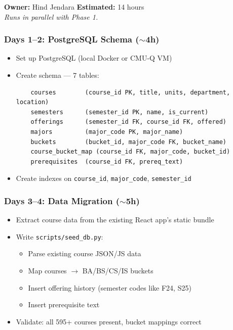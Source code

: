 \documentclass[11pt]{article}
\begin{document}
\textbf{Owner:} Hind Jendara \hfill \textbf{Estimated:} 14 hours\\
\textit{Runs in parallel with Phase 1.}

\subsubsection{Days 1--2: PostgreSQL Schema ($\sim$4h)}

\begin{itemize}[leftmargin=2em]
    \item Set up PostgreSQL (local Docker or CMU-Q VM)
    \item Create schema — 7 tables:
    
    \begin{verbatim}
    courses        (course_id PK, title, units, department, location)
    semesters      (semester_id PK, name, is_current)
    offerings      (semester_id FK, course_id FK, offered)
    majors         (major_code PK, major_name)
    buckets        (bucket_id, major_code FK, bucket_name)
    course_bucket_map (course_id FK, major_code, bucket_id)
    prerequisites  (course_id FK, prereq_text)
    \end{verbatim}
    
    \item Create indexes on \texttt{course\_id}, \texttt{major\_code}, \texttt{semester\_id}
\end{itemize}

\subsubsection{Days 3--4: Data Migration ($\sim$5h)}

\begin{itemize}[leftmargin=2em]
    \item Extract course data from the existing React app's static bundle
    \item Write \texttt{scripts/seed\_db.py}:
    \begin{itemize}
        \item Parse existing course JSON/JS data
        \item Map courses $\rightarrow$ BA/BS/CS/IS buckets
        \item Insert offering history (semester codes like F24, S25)
        \item Insert prerequisite text
    \end{itemize}
    \item Validate: all 595+ courses present, bucket mappings correct
\end{itemize}
\end{document}

